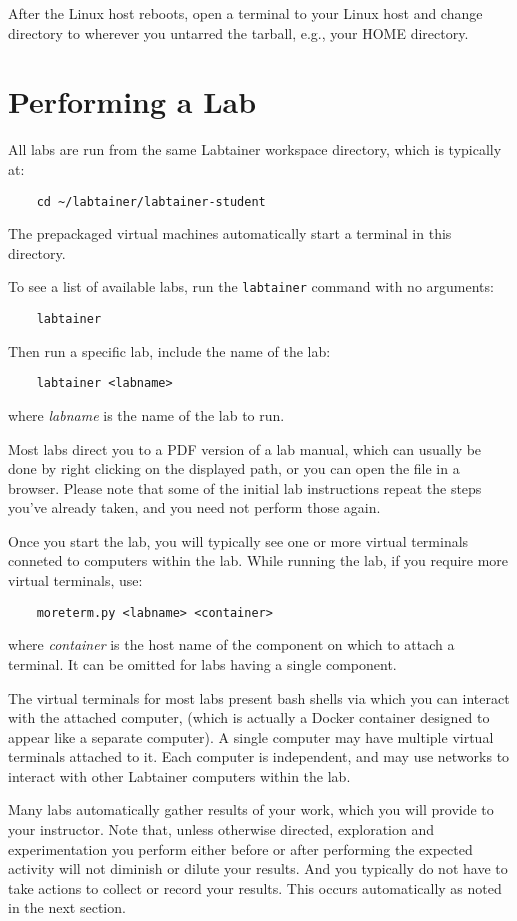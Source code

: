\documentclass[12pt]{article}
\begin{document}
After the Linux host reboots, open a terminal to your Linux host and
change directory to wherever you untarred the tarball, e.g., your HOME directory.

\section{Performing a Lab}
All labs are run from the same Labtainer workspace directory, which is typically at:
\begin{verbatim}
    cd ~/labtainer/labtainer-student
\end{verbatim}
\noindent The prepackaged virtual machines automatically start a terminal in this directory.

To see a list of available labs, run the {\tt labtainer} command with no arguments:
\begin{verbatim}
    labtainer 
\end{verbatim}
Then run a specific lab, include the name of the lab:
\begin{verbatim}
    labtainer <labname>
\end{verbatim}
\noindent where \textit{labname} is the name of the lab to run.  

Most labs direct you to a PDF version of a lab manual, which can usually 
be done by right clicking on the displayed path, or you can open the file in a browser.
Please note that some of the initial lab instructions repeat the steps you've already taken, and you need
not perform those again.  

Once you start the lab, you will typically see one or more virtual terminals conneted to computers within
the lab.  While running the lab, if you require more virtual terminals, use:
\begin{verbatim}
    moreterm.py <labname> <container>
\end{verbatim}
\noindent where \textit{container} is the host name of the component on which to attach a terminal.  
It can be omitted for labs having a single component.

The virtual terminals for most labs present bash shells via which you can interact
with the attached computer, (which is actually a Docker container designed to appear
like a separate computer).  A single computer
may have multiple virtual terminals attached to it.  Each computer is independent, and 
may use networks to interact with other Labtainer computers within the lab.  

Many labs automatically gather results of your work, which you will provide to your instructor.
Note that, unless otherwise directed, exploration and experimentation you perform either before
or after performing the expected activity will not diminish or dilute your results.  And you typically
do not have to take actions to collect or record your results.  This occurs automatically as noted in the 
next section.  
\end{document}
